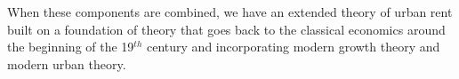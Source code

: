 When these components are  combined,  we have an extended theory of urban rent built on a foundation of theory that goes back to the \gls{classical economics} around the beginning of the 19$^{th}$ century and incorporating modern growth theory and modern urban theory.




 





